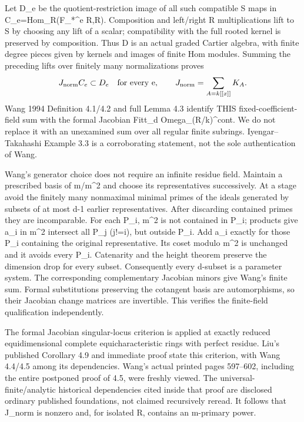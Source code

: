 \documentclass[11pt]{article}
\begin{document}
Let D\_e be the quotient-restriction image of all such compatible S maps in C\_e=Hom\_R(F\_*\textasciicircum{}e R,R). Composition and left/right R multiplications lift to S by choosing any lift of a scalar; compatibility with the full rooted kernel is preserved by composition. Thus D is an actual graded Cartier algebra, with finite degree pieces given by kernels and images of finite Hom modules. Summing the preceding lifts over finitely many normalizations proves
\[
J_{\rm norm} C_e\subset D_e\quad\hbox{for every e},\qquad
J_{\rm norm}=\sum_{A=k[[x]]}K_A.
\]
Wang 1994 Definition 4.1/4.2 and full Lemma 4.3 identify THIS fixed-coefficient-field sum with the formal Jacobian Fitt\_d Omega\_(R/k)\textasciicircum{}cont. We do not replace it with an unexamined sum over all regular finite subrings. Iyengar--Takahashi Example 3.3 is a corroborating statement, not the sole authentication of Wang.

Wang's generator choice does not require an infinite residue field. Maintain a prescribed basis of m/m\textasciicircum{}2 and choose its representatives successively. At a stage avoid the finitely many nonmaximal minimal primes of the ideals generated by subsets of at most d-1 earlier representatives. After discarding contained primes they are incomparable. For each P\_i, m\textasciicircum{}2 is not contained in P\_i; products give a\_i in m\textasciicircum{}2 intersect all P\_j (j!=i), but outside P\_i. Add a\_i exactly for those P\_i containing the original representative. Its coset modulo m\textasciicircum{}2 is unchanged and it avoids every P\_i. Catenarity and the height theorem preserve the dimension drop for every subset. Consequently every d-subset is a parameter system. The corresponding complementary Jacobian minors give Wang's finite sum. Formal substitutions preserving the cotangent basis are automorphisms, so their Jacobian change matrices are invertible. This verifies the finite-field qualification independently.

The formal Jacobian singular-locus criterion is applied at exactly reduced equidimensional complete equicharacteristic rings with perfect residue. Liu's published Corollary 4.9 and immediate proof state this criterion, with Wang 4.4/4.5 among its dependencies. Wang's actual printed pages 597--602, including the entire postponed proof of 4.5, were freshly viewed. The universal-finite/analytic historical dependencies cited inside that proof are disclosed ordinary published foundations, not claimed recursively reread. It follows that J\_norm is nonzero and, for isolated R, contains an m-primary power.
\end{document}
